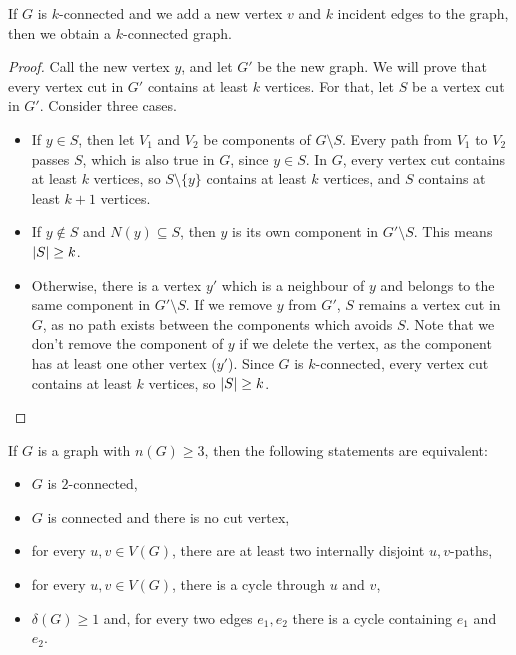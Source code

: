 \begin{theorem}
  If $G$ is $k$-connected and we add a new vertex $v$ and $k$ incident edges to
  the graph, then we obtain a $k$-connected graph.
\end{theorem}

\begin{proof}
  Call the new vertex $y$, and let $G'$ be the new graph.
  We will prove that every vertex cut in $G'$ contains at least $k$ vertices.
  For that, let $S$ be a vertex cut in $G'$.
  Consider three cases.
  \begin{itemize}
  \item If $y \in S$, then let $V_1$ and $V_2$ be components of $G \setminus S$.
	Every path from $V_1$ to $V_2$ passes $S$, which is also true in $G$, since
	$y \in S$.
	In $G$, every vertex cut contains at least $k$ vertices, so $S \setminus
	\{y\}$ contains at least $k$ vertices, and $S$ contains at least $k+1$
	vertices.

  \item If $y \notin S$ and $N(y) \subseteq S$, then $y$ is its own component in
	$G' \setminus S$.
	This means $\left| S \right| \ge k$.

  \item Otherwise, there is a vertex $y'$ which is a neighbour of $y$ and
	belongs to the same component in $G' \setminus S$.
	If we remove $y$ from $G'$, $S$ remains a vertex cut in $G$, as no path
	exists between the components which avoids $S$.
	Note that we don't remove the component of $y$ if we delete the vertex, as
	the component has at least one other vertex ($y'$).
	Since $G$ is $k$-connected, every vertex cut contains at least $k$ vertices,
	so $\left| S \right| \ge k$.
  \end{itemize}
\end{proof}

\begin{theorem}
  If $G$ is a graph with $n(G) \ge 3$, then the following statements are
  equivalent:
  \begin{itemize}
  \item $G$ is $2$-connected,
  \item $G$ is connected and there is no cut vertex,
  \item for every $u,v \in V(G)$, there are at least two internally disjoint
	$u,v$-paths,
  \item for every $u,v \in V(G)$, there is a cycle through $u$ and $v$,
  \item $\delta(G) \ge 1$ and, for every two edges $e_1, e_2$ there is a cycle
	containing $e_1$ and $e_2$.
  \end{itemize}
\end{theorem}

